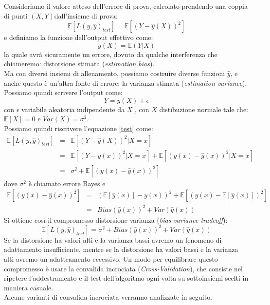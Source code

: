 \documentclass[a4paper,12pt,oneside]{book}
\begin{document}
Consideriamo il valore atteso dell'errore di prova, calcolato prendendo una coppia di punti $(X,Y)$dall'insieme di prova:
\begin{equation}\label{test}
\mathbb{E} [L(y,\hat{y})_{test}]=\mathbb{E} [(Y-\hat{y}(X))^{2}]
\end{equation}
e definiamo la funzione dell'output effettivo come:
$$y(X)=\mathbb{E}(Y|X)$$
la quale avr\`{a} sicuramente un errore, dovuto da qualche interferenza che chiameremo: distorsione stimata (\textit{estimation bias}).\\
Ma con diversi insiemi di allenamento, possiamo costruire diverse funzioni $\hat{y}$, e anche questo \`e un'altra fonte di errore: la varianza stimata (\textit{estimation variance}). Possiamo quindi scrivere l'output come:
$$Y=y(X)+\epsilon$$ con $\epsilon$ variabile aleatoria indipendente da $X$ , con $X$ distibuzione normale tale che: $\mathbb{E}[X]=0$ e $Var(X)=\sigma^{2}$.\\
Possiamo quindi riscrivere l'equazione \ref{test} come:
\begin{eqnarray}
\mathbb{E} [L(y,\hat{y})_{test}] &=&\mathbb{E} [(Y-\hat{y}(X))^{2}|X=x]\nonumber\\
&=&\mathbb{E}[(Y-y(x))^2 |X=x]+\mathbb{E}[(y(x)-\hat{y}(x))^{2}|X=x]\nonumber\\
&=&\sigma^{2}+\mathbb{E}[(y(x)-\hat{y}(x))^{2}]
\end{eqnarray}
dove $\sigma^{2}$ \`e chiamato errore Bayes e
\begin{eqnarray}
\mathbb{E}[(y(x)-\hat{y}(x))^{2}]&=&(\mathbb{E}[\hat{y}(x)]-y(x))^{2}+\mathbb{E}[(\hat{y}(x)-\mathbb{E}[\hat{y}(x)])^{2}]\nonumber\\
&=&Bias(\hat{y}(x))^{2}+Var(\hat{y}(x))
\end{eqnarray}
Si ottiene cos\'{\i} il compromesso distorsione-varianza (\textit{bias-variance tradeoff}):
\begin{equation}
\mathbb{E} [L(y,\hat{y})_{test}]=\sigma^2+Bias(\hat{y}(x))^2 + Var(\hat{y}(x))
\end{equation}
Se la distorsione ha valori alti e la varianza bassi avremo un fenomeno di adattamento insufficiente, mentre se la distorsione ha valori bassi e la varianza alti avremo un adatteamento eccessivo.\cite{errval}
Un modo per equilibrare questo compromesso \`e usare la convalida incrociata (\textit{Cross-Validation}), che consiste nel ripetere l'addestramento e il test dell'algoritmo ogni volta su sottoinsiemi scelti in maniera casuale.\\
Alcune varianti di convalida incrociata verranno analizzate in seguito.
\end{document}
